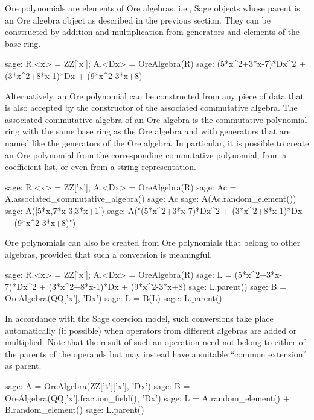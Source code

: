 \documentclass[11pt]{amsart}
\begin{document}
Ore polynomials are elements of Ore algebras, i.e., Sage objects whose parent is an Ore algebra
object as described in the previous section. They can be constructed by addition and multiplication
from generators and elements of the base ring. 

\begin{sageexample}
  sage: R.<x> = ZZ['x']; A.<Dx> = OreAlgebra(R)
  sage: (5*x^2+3*x-7)*Dx^2 + (3*x^2+8*x-1)*Dx + (9*x^2-3*x+8)
\end{sageexample}

Alternatively, an Ore polynomial can be constructed from any piece of data that is also accepted
by the constructor of the associated commutative algebra. The associated commutative algebra of
an Ore algebra is the commutative polynomial ring with the same base ring as the Ore algebra 
and with generators that are named like the generators of the Ore algebra. In particular, it is
possible to create an Ore polynomial from the corresponding commutative polynomial, from a 
coefficient list, or even from a string representation.

\begin{sageexample}
  sage: R.<x> = ZZ['x']; A.<Dx> = OreAlgebra(R)
  sage: Ac = A.associated_commutative_algebra()
  sage: Ac
  sage: A(Ac.random_element())
  sage: A([5*x,7*x-3,3*x+1])
  sage: A("(5*x^2+3*x-7)*Dx^2 + (3*x^2+8*x-1)*Dx + (9*x^2-3*x+8)")
\end{sageexample}

Ore polynomials can also be created from Ore polynomials that belong to other algebras, provided
that such a conversion is meaningful. 

\begin{sageexample}
  sage: R.<x> = ZZ['x']; A.<Dx> = OreAlgebra(R)
  sage: L = (5*x^2+3*x-7)*Dx^2 + (3*x^2+8*x-1)*Dx + (9*x^2-3*x+8)
  sage: L.parent()
  sage: B = OreAlgebra(QQ['x'], 'Dx')
  sage: L = B(L)
  sage: L.parent()
\end{sageexample}

In accordance with the Sage coercion model, such conversions take place automatically (if possible) 
when operators from different algebras are added or multiplied. Note that the result of such an operation
need not belong to either of the parents of the operands but may instead have a suitable ``common extension'' 
as parent. 

\begin{sageexample}
  sage: A = OreAlgebra(ZZ['t']['x'], 'Dx')
  sage: B = OreAlgebra(QQ['x'].fraction_field(), 'Dx')
  sage: L = A.random_element() + B.random_element()
  sage: L.parent()
\end{sageexample}
\end{document}
